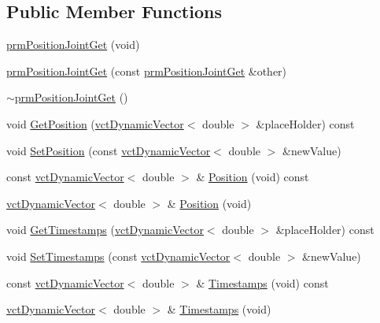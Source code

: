 \subsection*{Public Member Functions}
\begin{DoxyCompactItemize}
\item 
\hyperlink{classprm_position_joint_get_a69350009ebaba3339c0ec32b3aae6b7f}{prm\-Position\-Joint\-Get} (void)
\item 
\hyperlink{classprm_position_joint_get_a72c1c1f68659da9dbe32b7127515454e}{prm\-Position\-Joint\-Get} (const \hyperlink{classprm_position_joint_get}{prm\-Position\-Joint\-Get} \&other)
\item 
\hyperlink{classprm_position_joint_get_aabb4b6e77618eeab9dbf6d99fcae03ff}{$\sim$prm\-Position\-Joint\-Get} ()
\item 
void \hyperlink{classprm_position_joint_get_a83e71431f7e086cff80c7d905b734ada}{Get\-Position} (\hyperlink{classvct_dynamic_vector}{vct\-Dynamic\-Vector}$<$ double $>$ \&place\-Holder) const 
\item 
void \hyperlink{classprm_position_joint_get_a97b3fa06196951db95c14f397d05bc45}{Set\-Position} (const \hyperlink{classvct_dynamic_vector}{vct\-Dynamic\-Vector}$<$ double $>$ \&new\-Value)
\item 
const \hyperlink{classvct_dynamic_vector}{vct\-Dynamic\-Vector}$<$ double $>$ \& \hyperlink{classprm_position_joint_get_afc1c32503dade0821a035a42bf516f46}{Position} (void) const 
\item 
\hyperlink{classvct_dynamic_vector}{vct\-Dynamic\-Vector}$<$ double $>$ \& \hyperlink{classprm_position_joint_get_ae843013936bd6ceb74be7e5bda222f45}{Position} (void)
\item 
void \hyperlink{classprm_position_joint_get_a93c87fa32a3a893941b6943f399de3c9}{Get\-Timestamps} (\hyperlink{classvct_dynamic_vector}{vct\-Dynamic\-Vector}$<$ double $>$ \&place\-Holder) const 
\item 
void \hyperlink{classprm_position_joint_get_a59fbbf80a182141a7e74d509a7e06d00}{Set\-Timestamps} (const \hyperlink{classvct_dynamic_vector}{vct\-Dynamic\-Vector}$<$ double $>$ \&new\-Value)
\item 
const \hyperlink{classvct_dynamic_vector}{vct\-Dynamic\-Vector}$<$ double $>$ \& \hyperlink{classprm_position_joint_get_a90c9b7024463a9d8d53c183bd79c267d}{Timestamps} (void) const 
\item 
\hyperlink{classvct_dynamic_vector}{vct\-Dynamic\-Vector}$<$ double $>$ \& \hyperlink{classprm_position_joint_get_a0ab163bc7b0d4c38fb1653b6f1d1ae2a}{Timestamps} (void)

\end{DoxyCompactItemize}
